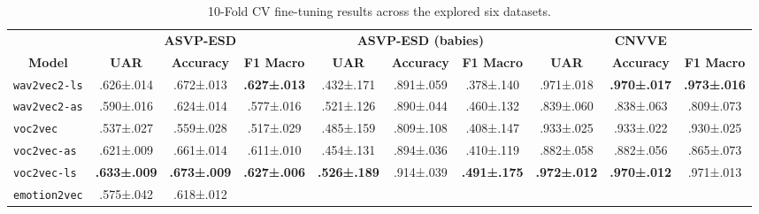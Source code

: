 \begin{table*}[]
\caption{10-Fold CV fine-tuning results across the explored six datasets.}
\label{table:results}
\centering
\begin{tabular}{l|ccc|ccc|ccc}
\toprule
\multicolumn{1}{c}{} &
  \multicolumn{3}{c}{\textbf{ASVP-ESD}} &
  \multicolumn{3}{c}{\textbf{ASVP-ESD (babies)}} &
  \multicolumn{3}{c}{\textbf{CNVVE}} \\
\multicolumn{1}{c}{\multirow{-2}{*}{\textbf{Model}}} &
  \textbf{UAR} &
  \textbf{Accuracy} &
  \textbf{F1 Macro} &
  \textbf{UAR} &
  \textbf{Accuracy} &
  \textbf{F1 Macro} &
  \textbf{UAR} &
  \textbf{Accuracy} &
  \textbf{F1 Macro} \\
\midrule

\texttt{wav2vec2-ls} &
  .626\scriptsize±.014 &
  .672\scriptsize±.013 &
  \cellcolor[HTML]{D9EAD3}\textbf{.627\scriptsize±.013} &
  .432\scriptsize±.171 &
  .891\scriptsize±.059 &
  .378\scriptsize±.140 &
  .971\scriptsize±.018 &
  \cellcolor[HTML]{D9EAD3}\textbf{.970\scriptsize±.017} &
  \cellcolor[HTML]{D9EAD3}\textbf{.973\scriptsize±.016} \\
\texttt{wav2vec2-as} &
  .590\scriptsize±.016 &
  .624\scriptsize±.014 &
  .577\scriptsize±.016 &
  .521\scriptsize±.126 &
  .890\scriptsize±.044 &
  .460\scriptsize±.132 &
  .839\scriptsize±.060 &
  .838\scriptsize±.063 &
  .809\scriptsize±.073 \\
\texttt{voc2vec} &
  .537\scriptsize±.027 &
  .559\scriptsize±.028 &
  .517\scriptsize±.029 &
  .485\scriptsize±.159 &
  .809\scriptsize±.108 &
  .408\scriptsize±.147 &
  .933\scriptsize±.025 &
  .933\scriptsize±.022 &
  .930\scriptsize±.025 \\
\texttt{voc2vec-as} &
  .621\scriptsize±.009 &
  .661\scriptsize±.014 &
  .611\scriptsize±.010 &
  .454\scriptsize±.131 &
  .894\scriptsize±.036 &
  .410\scriptsize±.119 &
  .882\scriptsize±.058 &
  .882\scriptsize±.056 &
  .865\scriptsize±.073 \\
\texttt{voc2vec-ls} &
  \cellcolor[HTML]{D9EAD3}\textbf{.633\scriptsize±.009} &
  \cellcolor[HTML]{D9EAD3}\textbf{.673\scriptsize±.009} &
  \cellcolor[HTML]{D9EAD3}\textbf{.627\scriptsize±.006} &
  \cellcolor[HTML]{D9EAD3}\textbf{.526\scriptsize±.189} &
  .914\scriptsize±.039 &
  \cellcolor[HTML]{D9EAD3}\textbf{.491\scriptsize±.175} &
  \cellcolor[HTML]{D9EAD3}\textbf{.972\scriptsize±.012} &
  \cellcolor[HTML]{D9EAD3}\textbf{.970\scriptsize±.012} &
  .971\scriptsize±.013 \\
\texttt{emotion2vec} &
  .575\scriptsize±.042 &
  .618\scriptsize±.012 &

\end{tabular}
\end{table*}
